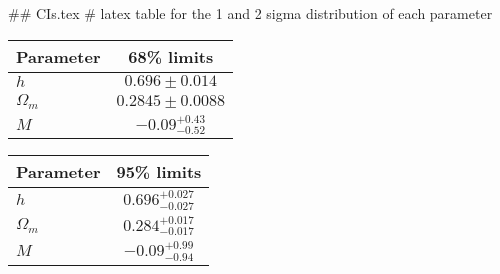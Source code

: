 ## CIs.tex
# latex table for the 1 and 2 sigma distribution of each parameter

\begin{tabular} { l  c}
 Parameter &  68\% limits\\
\hline
{\boldmath$h              $} & $0.696\pm 0.014            $\\
{\boldmath$\Omega_m       $} & $0.2845\pm 0.0088          $\\
{\boldmath$M              $} & $-0.09^{+0.43}_{-0.52}     $\\
\hline
\end{tabular}

\begin{tabular} { l  c}
 Parameter &  95\% limits\\
\hline
{\boldmath$h              $} & $0.696^{+0.027}_{-0.027}   $\\
{\boldmath$\Omega_m       $} & $0.284^{+0.017}_{-0.017}   $\\
{\boldmath$M              $} & $-0.09^{+0.99}_{-0.94}     $\\
\hline
\end{tabular}
